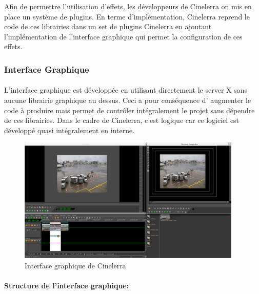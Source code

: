 Afin de permettre l'utilisation d'effets, les développeurs de Cinelerra
on mis en place un système de plugins. En terme d'implémentation,
Cinelerra reprend le code de ces librairies dans un set de plugins
Cinelerra en ajoutant l'implémentation de l'interface graphique qui
permet la configuration de ces effets.

\subsubsection{Interface Graphique}

\paragraph{}

L'interface graphique est développée en utilisant directement le server
X sans aucune librairie graphique au dessus. Ceci a pour conséquence d'
augmenter le code à produire mais permet de contrôler intégralement le
projet sans dépendre de ces librairies.  Dans le cadre de Cinelerra,
c'est logique car ce logiciel est développé quasi intégralement
en interne.

\begin{figure} [H]

  \begin{center}

    \includegraphics[width=0.95\textwidth]{images/cinelerra}

  \end{center}

  \caption{Interface graphique de Cinelerra}

  \label{Yes}

\end{figure}

\paragraph{Structure de l'interface graphique:}

